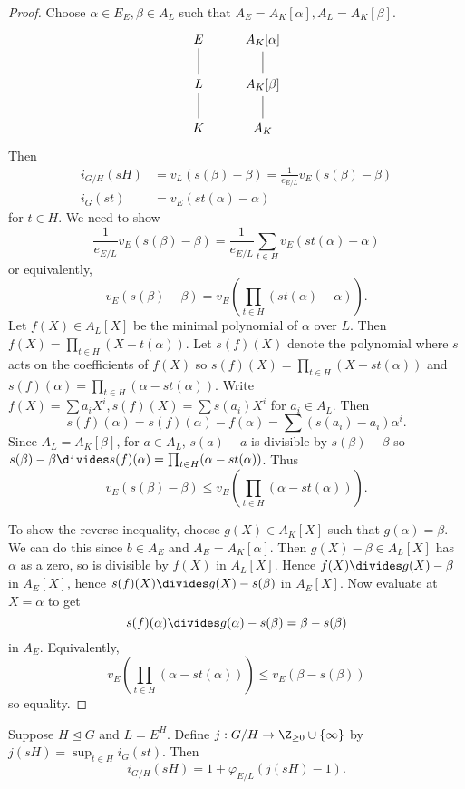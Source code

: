\documentclass[a4paper]{article}
\begin{document}
\begin{proof}
  Choose \(\alpha \in E_E, \beta \in A_L\) such that \(A_E = A_K[\alpha], A_L = A_K[\beta]\).
  \[
    \begin{tikzcd}
      E \ar[d, dash] & A_K[\alpha] \ar[d, dash] \\
      L \ar[d, dash] & A_K[\beta] \ar[d, dash] \\
      K & A_K
    \end{tikzcd}
  \]
  Then
  \begin{align*}
    i_{G/H}(sH) &= v_L(s(\beta) - \beta) = \frac{1}{e_{E/L}} v_E(s(\beta) - \beta) \\
    i_G(st) &= v_E(st(\alpha) - \alpha)
  \end{align*}
  for \(t \in H\). We need to show
  \[
     \frac{1}{e_{E/L}} v_E(s(\beta) - \beta) = \frac{1}{e_{E/L}} \sum_{t \in H} v_E(st(\alpha) - \alpha)
  \]
  or equivalently,
  \[
    v_E(s(\beta) - \beta) = v_E(\prod_{t \in H} (st(\alpha) - \alpha)).
  \]
  Let \(f(X) \in A_L[X]\) be the minimal polynomial of \(\alpha\) over \(L\). Then \(f(X) = \prod_{t \in H} (X - t(\alpha))\). Let \(s(f)(X)\) denote the polynomial where \(s\) acts on the coefficients of \(f(X)\) so \(s(f)(X) = \prod_{t \in H} (X - st(\alpha))\) and \(s(f)(\alpha) = \prod_{t \in H}(\alpha - st(\alpha))\). Write \(f(X) = \sum a_i X^i, s(f)(X) = \sum s(a_i)X^i\) for \(a_i \in A_L\). Then
  \[
    s(f)(\alpha) = s(f)(\alpha) - f(\alpha) = \sum (s(a_i) - a_i) \alpha^i.
  \]
  Since \(A_L = A_K[\beta]\), for \(a \in A_L\), \(s(a) - a\) is divisible by \(s(\beta) - \beta\) so \(s(\beta) - \beta \divides s(f)(\alpha) = \prod_{t \in H}(\alpha - st(\alpha))\). Thus
  \[
    v_E(s(\beta) - \beta) \leq v_E(\prod_{t \in H}(\alpha - st(\alpha))).
  \]

  To show the reverse inequality, choose \(g(X) \in A_K[X]\) such that \(g(\alpha) = \beta\). We can do this since \(b \in A_E\) and \(A_E = A_K[\alpha]\). Then \(g(X) - \beta \in A_L[X]\) has \(\alpha\) as a zero, so is divisible by \(f(X)\) in \(A_L[X]\). Hence \(f(X) \divides g(X) - \beta\) in \(A_E[X]\), hence \(s(f)(X) \divides g(X) - s(\beta)\) in \(A_E[X]\). Now evaluate at \(X = \alpha\) to get
  \[
    s(f)(\alpha) \divides g(\alpha) - s(\beta) = \beta - s(\beta)
  \]
  in \(A_E\). Equivalently,
  \[
    v_E(\prod_{t \in H}(\alpha - st(\alpha))) \leq v_E(\beta - s(\beta))
  \]
  so equality.
\end{proof}

\begin{lemma}
  Suppose \(H \trianglelefteq G\) and \(L = E^H\). Define \(j: G/H \to \Z_{\geq 0} \cup \{\infty\}\) by \(j(sH) = \sup_{t \in H} i_G(st)\). Then
  \[
    i_{G/H}(sH) = 1 + \varphi_{E/L}(j(sH) - 1).
  \]
\end{lemma}
\end{document}
